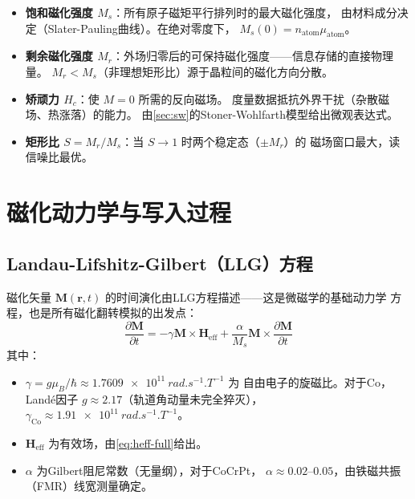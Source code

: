 \documentclass[11pt,a4paper,twoside]{article}
\theoremstyle{definition}
\theoremstyle{plain}
\theoremstyle{remark}
\begin{document}
\begin{itemize}
  \item \textbf{饱和磁化强度 $M_s$}：所有原子磁矩平行排列时的最大磁化强度，
  由材料成分决定（Slater-Pauling曲线）。在绝对零度下，
  $M_s(0) = n_{\text{atom}} \mu_{\text{atom}}$。
  \item \textbf{剩余磁化强度 $M_r$}：外场归零后的可保持磁化强度——信息存储的直接物理量。
  $M_r < M_s$（非理想矩形比）源于晶粒间的磁化方向分散。
  \item \textbf{矫顽力 $H_c$}：使 $M = 0$ 所需的反向磁场。
  度量数据抵抗外界干扰（杂散磁场、热涨落）的能力。
  由\cref{sec:sw}的Stoner-Wohlfarth模型给出微观表达式。
  \item \textbf{矩形比 $S = M_r / M_s$}：当 $S \to 1$ 时两个稳定态（$\pm M_r$）的
  磁场窗口最大，读信噪比最优。
\end{itemize}

\section{磁化动力学与写入过程}
\label{sec:writing}

\subsection{Landau-Lifshitz-Gilbert（LLG）方程}
\label{sec:llg}

磁化矢量 $\mathbf{M}(\mathbf{r}, t)$ 的时间演化由LLG方程描述——这是微磁学的基础动力学
方程，也是所有磁化翻转模拟的出发点：
\begin{equation}\label{eq:llg}
  \boxed{
  \frac{\partial \mathbf{M}}{\partial t}
  = -\gamma \mathbf{M} \times \mathbf{H}_{\text{eff}}
  + \frac{\alpha}{M_s} \mathbf{M} \times \frac{\partial \mathbf{M}}{\partial t}
  }
\end{equation}
其中：
\begin{itemize}
  \item $\gamma = g \mu_B / \hbar \approx \SI{1.7609e11}{rad.s^{-1}.T^{-1}}$ 为
  自由电子的旋磁比。对于Co，Land\'{e}因子 $g \approx 2.17$（轨道角动量未完全猝灭），
  $\gamma_{\text{Co}} \approx \SI{1.91e11}{rad.s^{-1}.T^{-1}}$。
  \item $\mathbf{H}_{\text{eff}}$ 为有效场，由\cref{eq:heff-full}给出。
  \item $\alpha$ 为Gilbert阻尼常数（无量纲），对于CoCrPt，
  $\alpha \approx 0.02$--$0.05$，由铁磁共振（FMR）线宽测量确定。
\end{itemize}
\end{document}
